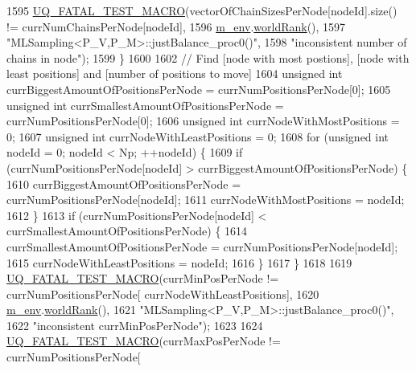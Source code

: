 \begin{DoxyCode}
1595       \hyperlink{_defines_8h_a56d63d18d0a6d45757de47fcc06f574d}{UQ\_FATAL\_TEST\_MACRO}(vectorOfChainSizesPerNode[nodeId].size() != 
      currNumChainsPerNode[nodeId],
1596                           \hyperlink{class_q_u_e_s_o_1_1_m_l_sampling_a13f1ca4fe9f94822fe572a743eaced1d}{m\_env}.\hyperlink{class_q_u_e_s_o_1_1_base_environment_a78b57112bbd0e6dd0e8afec00b40ffa7}{worldRank}(),
1597                           \textcolor{stringliteral}{"MLSampling<P\_V,P\_M>::justBalance\_proc0()"},
1598                           \textcolor{stringliteral}{"inconsistent number of chains in node"});
1599     \}
1600 
1602     \textcolor{comment}{// Find [node with most postions], [node with least positions] and [number of positions to move]}
1604 \textcolor{comment}{}    \textcolor{keywordtype}{unsigned} \textcolor{keywordtype}{int} currBiggestAmountOfPositionsPerNode  = currNumPositionsPerNode[0];
1605     \textcolor{keywordtype}{unsigned} \textcolor{keywordtype}{int} currSmallestAmountOfPositionsPerNode = currNumPositionsPerNode[0];
1606     \textcolor{keywordtype}{unsigned} \textcolor{keywordtype}{int} currNodeWithMostPositions = 0;
1607     \textcolor{keywordtype}{unsigned} \textcolor{keywordtype}{int} currNodeWithLeastPositions = 0;
1608     \textcolor{keywordflow}{for} (\textcolor{keywordtype}{unsigned} \textcolor{keywordtype}{int} nodeId = 0; nodeId < Np; ++nodeId) \{
1609       \textcolor{keywordflow}{if} (currNumPositionsPerNode[nodeId] > currBiggestAmountOfPositionsPerNode) \{
1610         currBiggestAmountOfPositionsPerNode = currNumPositionsPerNode[nodeId];
1611         currNodeWithMostPositions = nodeId;
1612       \}
1613       \textcolor{keywordflow}{if} (currNumPositionsPerNode[nodeId] < currSmallestAmountOfPositionsPerNode) \{
1614         currSmallestAmountOfPositionsPerNode = currNumPositionsPerNode[nodeId];
1615         currNodeWithLeastPositions = nodeId;
1616       \}
1617     \}
1618 
1619     \hyperlink{_defines_8h_a56d63d18d0a6d45757de47fcc06f574d}{UQ\_FATAL\_TEST\_MACRO}(currMinPosPerNode != currNumPositionsPerNode[
      currNodeWithLeastPositions],
1620                         \hyperlink{class_q_u_e_s_o_1_1_m_l_sampling_a13f1ca4fe9f94822fe572a743eaced1d}{m\_env}.\hyperlink{class_q_u_e_s_o_1_1_base_environment_a78b57112bbd0e6dd0e8afec00b40ffa7}{worldRank}(),
1621                         \textcolor{stringliteral}{"MLSampling<P\_V,P\_M>::justBalance\_proc0()"},
1622                         \textcolor{stringliteral}{"inconsistent currMinPosPerNode"});
1623 
1624     \hyperlink{_defines_8h_a56d63d18d0a6d45757de47fcc06f574d}{UQ\_FATAL\_TEST\_MACRO}(currMaxPosPerNode != currNumPositionsPerNode[

\end{DoxyCode}
